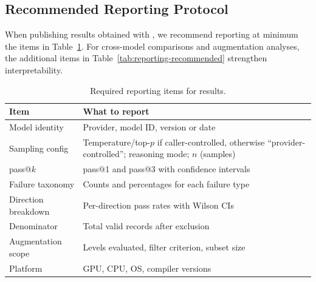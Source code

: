 \subsection{Recommended Reporting Protocol}
\label{sec:ec-reporting}

When publishing results obtained with \parbench{}, we recommend reporting at
minimum the items in Table~\ref{tab:reporting-required}. For cross-model
comparisons and augmentation analyses, the additional items in
Table~\ref{tab:reporting-recommended} strengthen interpretability.

\begin{table}[htbp]
\centering
\caption{Required reporting items for \parbench{} results.}
\label{tab:reporting-required}
\small
\begin{tabularx}{\columnwidth}{@{}p{2.3cm}X@{}}
\toprule
Item & What to report \\
\midrule
Model identity & Provider, model ID, version or date \\
Sampling config & Temperature/top-$p$ if caller-controlled, otherwise ``provider-controlled''; reasoning mode; $n$ (samples) \\
pass@$k$ & pass@1 and pass@3 with confidence intervals \\
Failure taxonomy & Counts and percentages for each failure type \\
Direction breakdown & Per-direction pass rates with Wilson CIs \\
Denominator & Total valid records after \knownfail{} exclusion \\
Augmentation scope & Levels evaluated, filter criterion, subset size \\
Platform & GPU, CPU, OS, compiler versions \\
\bottomrule
\end{tabularx}
\end{table}



